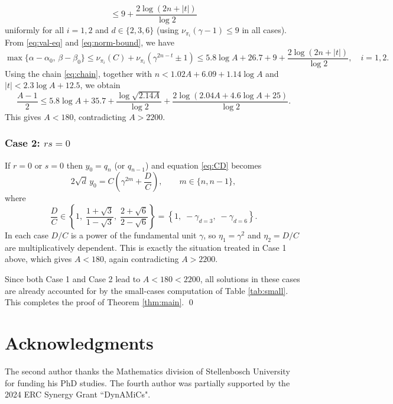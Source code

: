 \documentclass[11pt,a4paper]{article}
\numberwithin{equation}{section}
\numberwithin{table}{section}
\numberwithin{figure}{section}
\begin{document}
{\begin{equation*}
	\leq 9 + \frac{2\log(2n+|t|)}{\log 2}
\end{equation*}
uniformly for all $i=1,2$ and $d\in\{2,3,6\}$
(using $\nu_{\pi_i}(\gamma-1) \leq 9$ in all cases). From \eqref{eq:val-eq} and \eqref{eq:norm-bound}, we have
\begin{equation*}
	\max\{\alpha-\alpha_0,\,\beta-\beta_0\}
	\leq \nu_{\pi_i}(C) + \nu_{\pi_i}(\gamma^{2n-t}\pm 1)
	\leq 5.8\log A + 26.7 + 9 + \frac{2\log(2n+|t|)}{\log 2},\quad i=1,2.
\end{equation*}
Using the chain \eqref{eq:chain}, together with
$n < 1.02A + 6.09 + 1.14\log A$ and $|t| < 2.3\log A + 12.5$, we obtain 
\begin{equation*}
	\frac{A-1}{2} \leq 5.8\log A + 35.7 + \frac{\log\sqrt{2.14A}}{\log 2}
	+ \frac{2\log(2.04A + 4.6\log A + 25)}{\log 2}.
\end{equation*}
This gives $A < 180$, contradicting $A > 2200$.

\subsubsection*{Case 2: $rs = 0$}

If $r = 0$ or $s = 0$ then $y_0 = q_n$ (or $q_{n-1}$) and equation \eqref{eq:CD} becomes
\begin{equation*}
	2\sqrt{d}\,y_0 = C\!\left(\gamma^{2m} + \frac{D}{C}\right),\qquad m\in \{n,n-1\},
\end{equation*}
where
\begin{equation*}
	\frac{D}{C} \in \left\{1,\;
	\frac{1+\sqrt{3}}{1-\sqrt{3}},\;
	\frac{2+\sqrt{6}}{2-\sqrt{6}}\right\}
	= \left\{1,\; -\gamma_{d=3},\; -\gamma_{d=6}\right\}.
\end{equation*}
In each case $D/C$ is a power of the fundamental unit $\gamma$, so $\eta_1 = \gamma^2$ and $\eta_2 = D/C$ are multiplicatively dependent. This is exactly the situation treated in Case 1 above, which gives $A < 180$, again contradicting $A > 2200$.

\medskip

Since both Case 1 and Case 2 lead to $A < 180< 2200$, all solutions in these cases are already accounted for by the small-cases computation of Table \ref{tab:small}. This completes the proof of Theorem \ref{thm:main}. \qed



\section*{Acknowledgments} 
The second author thanks the Mathematics division of Stellenbosch University for funding his PhD studies. The fourth author was partially supported by the 2024 ERC Synergy Grant ``DynAMiCs". 

}
\end{document}
